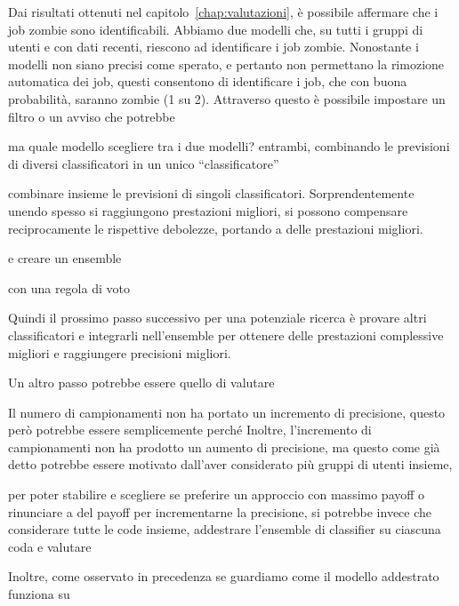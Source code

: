 \label{chap:explanation}

Dai risultati ottenuti nel capitolo~\ref{chap:valutazioni}, è possibile
affermare che i job zombie sono identificabili. Abbiamo due modelli che, su
tutti i gruppi di utenti e con dati recenti, riescono ad identificare i job
zombie. Nonostante i modelli non siano precisi come sperato, e pertanto non
permettano la rimozione automatica dei job, questi consentono di identificare
i job, che con buona probabilità, saranno zombie (1 su 2). Attraverso questo è
possibile impostare un filtro o un avviso che potrebbe 

ma quale modello scegliere tra i due modelli? entrambi, combinando le
previsioni di diversi classificatori in un unico ``classificatore''

 combinare insieme le previsioni di singoli classificatori. Sorprendentemente
 unendo spesso si raggiungono prestazioni migliori, si possono compensare
 reciprocamente le rispettive debolezze, portando a delle prestazioni
 migliori.

e creare un ensemble

con una regola di voto

Quindi il prossimo passo successivo per una potenziale ricerca è provare altri
classificatori e integrarli nell'ensemble per ottenere delle prestazioni
complessive migliori e raggiungere precisioni migliori.

Un altro passo potrebbe essere quello di valutare

Il numero di campionamenti non ha portato un incremento di precisione, questo
però potrebbe essere semplicemente perché
Inoltre, l'incremento di campionamenti non ha prodotto un aumento di
precisione, ma questo come già detto potrebbe essere motivato dall'aver
considerato più gruppi di utenti insieme,

per poter stabilire e scegliere se preferire un approccio con massimo payoff o
rinunciare a del payoff per incrementarne la precisione, si potrebbe invece
che considerare tutte le code insieme, addestrare l'ensemble di classifier su
ciascuna coda e valutare

Inoltre, come osservato in precedenza se guardiamo come il modello addestrato
funziona su


\begin{table}[!ht]
    \centering
    \confusionmatrix%
    {}{}%
    {}{}
    \caption{}
    \label{}
\end{table}

